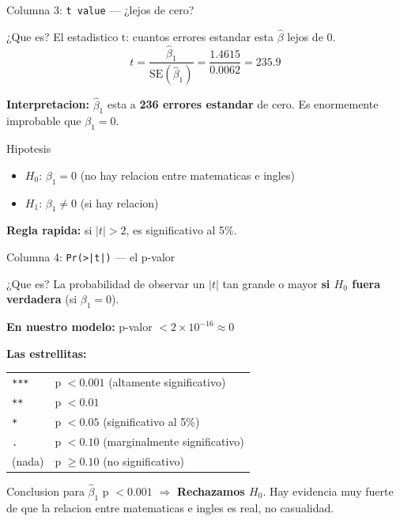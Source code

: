 \documentclass[aspectratio=169, 11pt]{beamer}
\begin{document}
\begin{frame}{Columna 3: \texttt{t value} --- ¿lejos de cero?}
\small
\begin{block}{¿Que es?}
El estadistico t: cuantos errores estandar esta $\hat{\beta}$ lejos de 0.
\[
t = \frac{\hat{\beta}_1}{\text{SE}(\hat{\beta}_1)} = \frac{1.4615}{0.0062} = 235.9
\]
\end{block}

\vspace{0.2cm}
\textbf{Interpretacion:} $\hat{\beta}_1$ esta a \textbf{236 errores estandar} de cero. Es enormemente improbable que $\beta_1 = 0$.

\vspace{0.2cm}
\begin{block}{Hipotesis}
\begin{itemize}
  \item $H_0$: $\beta_1 = 0$ (no hay relacion entre matematicas e ingles)
  \item $H_1$: $\beta_1 \neq 0$ (si hay relacion)
\end{itemize}
\end{block}

\textbf{Regla rapida:} si $|t| > 2$, es significativo al 5\%.
\end{frame}

\begin{frame}{Columna 4: \texttt{Pr(>|t|)} --- el p-valor}
\small
\begin{block}{¿Que es?}
La probabilidad de observar un $|t|$ tan grande o mayor \textbf{si $H_0$ fuera verdadera} (si $\beta_1 = 0$).
\end{block}

\vspace{0.2cm}
\textbf{En nuestro modelo:} p-valor $< 2 \times 10^{-16} \approx 0$

\vspace{0.2cm}
\textbf{Las estrellitas:}
\begin{center}
\begin{tabular}{ll}
\texttt{***} & p $< 0.001$ (altamente significativo) \\
\texttt{**} & p $< 0.01$ \\
\texttt{*} & p $< 0.05$ (significativo al 5\%) \\
\texttt{.} & p $< 0.10$ (marginalmente significativo) \\
(nada) & p $\geq 0.10$ (no significativo)
\end{tabular}
\end{center}

\vspace{0.2cm}
\begin{alertblock}{Conclusion para $\hat{\beta}_1$}
\small p $< 0.001$ $\Rightarrow$ \textbf{Rechazamos $H_0$}. Hay evidencia muy fuerte de que la relacion entre matematicas e ingles es real, no casualidad.
\end{alertblock}
\end{frame}
\end{document}
